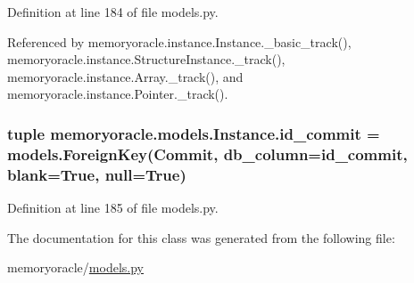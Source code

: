 Definition at line 184 of file models.\+py.



Referenced by memoryoracle.\+instance.\+Instance.\+\_\+basic\+\_\+track(), memoryoracle.\+instance.\+Structure\+Instance.\+\_\+track(), memoryoracle.\+instance.\+Array.\+\_\+track(), and memoryoracle.\+instance.\+Pointer.\+\_\+track().

\hypertarget{classmemoryoracle_1_1models_1_1Instance_aeece54a5639c30b9f8eb968266e78d07}{}
\subsubsection[{id\+\_\+commit}]{\setlength{\rightskip}{0pt plus 5cm}tuple memoryoracle.\+models.\+Instance.\+id\+\_\+commit = models.\+Foreign\+Key({\bf Commit}, db\+\_\+column=\textquotesingle{}id\+\_\+commit\textquotesingle{}, blank=True, null=True)\hspace{0.3cm}{\ttfamily [static]}}\label{classmemoryoracle_1_1models_1_1Instance_aeece54a5639c30b9f8eb968266e78d07}


Definition at line 185 of file models.\+py.



The documentation for this class was generated from the following file\+:\begin{DoxyCompactItemize}
\item 
memoryoracle/\hyperlink{models_8py}{models.\+py}\end{DoxyCompactItemize}
